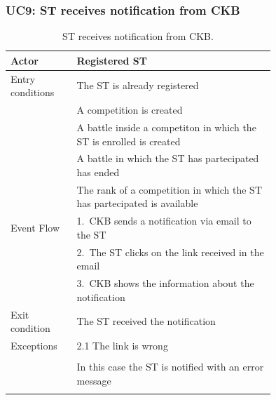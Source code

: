\subsubsection*{UC9: ST receives notification from CKB}
\begin{center}
  \begin{longtable}{l|p{0.75\linewidth}}
    \hline
    Actor & Registered ST \\
    \hline
    Entry conditions & The ST is already registered  \\
    & A competition is created \\
    & A battle inside a competiton in which the ST is enrolled is created \\
    & A battle in which the ST has partecipated has ended \\
    & The rank of a competition in which the ST has partecipated is available \\
    \hline
    Event Flow & 1.\ CKB sends a notification via email to the ST \\
    & 2.\ The ST clicks on the link received in the email \\
    & 3.\ CKB shows the information about the notification \\
    \hline
    Exit condition &  The ST received the notification \\
    \hline
    Exceptions & 2.1 The link is wrong \\ \\
    & In this case the ST is notified with an error message \\
    \hline
    \caption{ST receives notification from CKB.}
    \label{tab: ST_receive_notification}
  \end{longtable}


\end{center}
